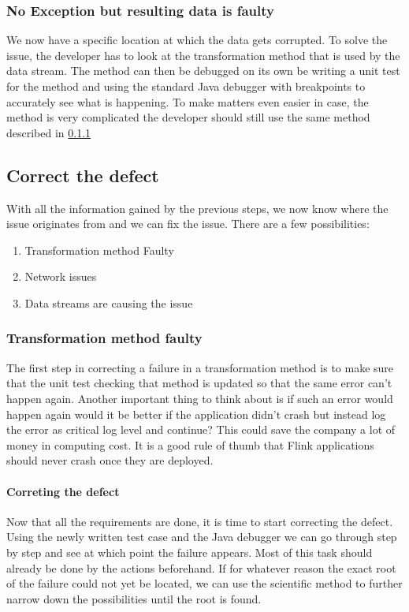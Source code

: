 \subsubsection{No Exception but resulting data is faulty}
We now have a specific location at which the data gets corrupted. To solve the issue, the developer has to look at the transformation method that is used by the data stream. The method can then be debugged on its own be writing a unit test for the method and using the standard Java debugger with breakpoints to accurately see what is happening. To make matters even easier in case, the method is very complicated the developer should still use the same method described in \ref{mdfCorrectTransformation}

\pagebreak

\subsection{Correct the defect}
With all the information gained by the previous steps, we now know where the issue originates from and we can fix the issue. There are a few possibilities:

\begin{enumerate}
  \item[\ref{mdfCorrectTransformation}] Transformation method Faulty
  \item[\ref{mdfCorrectNetwork}] Network issues
  \item[\ref{mdfCorrectDataStreams}] Data streams are causing the issue
\end{enumerate}

\subsubsection{Transformation method faulty}
\label{mdfCorrectTransformation}
The first step in correcting a failure in a transformation method is to make sure that the unit test checking that method is updated so that the same error can't happen again. Another important thing to think about is if such an error would happen again would it be better if the application didn't crash but instead log the error as critical log level and continue? This could save the company a lot of money in computing cost. It is a good rule of thumb that Flink applications should never crash once they are deployed.

\paragraph{Correting the defect} Now that all the requirements are done, it is time to start correcting the defect. Using the newly written test case and the Java debugger we can go through step by step and see at which point the failure appears. Most of this task should already be done by the actions beforehand. If for whatever reason the exact root of the failure could not yet be located, we can use the scientific method to further narrow down the possibilities until the root is found.

